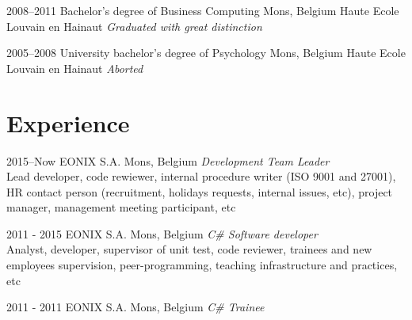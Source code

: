 \documentclass[a4paper]{cv-friggeri-x}
\begin{document}
\begin{entrylist}


\educationentry
{2008--2011}
{Bachelor’s degree {\normalfont of Business Computing}}
{Mons, Belgium}
{Haute Ecole Louvain en Hainaut}
{\emph{Graduated with great distinction}}


\educationentry
{2005--2008}
{University bachelor's degree {\normalfont of Psychology}}
{Mons, Belgium}
{Haute Ecole Louvain en Hainaut}
{\emph{Aborted}}


\end{entrylist}


\section{Experience}


\begin{entrylist}
\entry
{2015--Now}
{EONIX S.A.}
{Mons, Belgium}
{\emph{Development Team Leader}\\
Lead developer, code rewiewer, internal procedure writer (ISO 9001 and 27001), HR contact person (recruitment, holidays requests, internal issues, etc), project manager, management meeting participant, etc}
\end{entrylist}

\begin{entrylist}
\entry
{2011 - 2015}
{EONIX S.A.}
{Mons, Belgium}
{\emph{C\# Software developer}\\
Analyst, developer, supervisor of unit test, code reviewer, trainees and new employees supervision, peer-programming, teaching infrastructure and practices, etc}
\end{entrylist}

\begin{entrylist}
\entry
{2011 - 2011}
{EONIX S.A.}
{Mons, Belgium}
{\emph{C\# Trainee}}
\end{entrylist}

\end{document}
